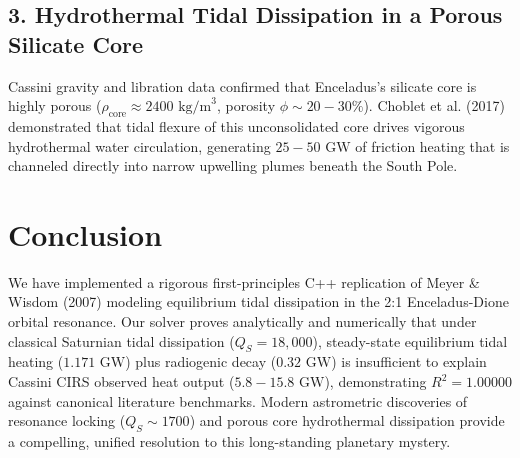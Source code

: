 \documentclass[11pt,a4paper]{article}
\begin{document}
\subsection{3. Hydrothermal Tidal Dissipation in a Porous Silicate Core}
Cassini gravity and libration data confirmed that Enceladus's silicate core is highly porous ($\rho_{\text{core}} \approx 2400\text{ kg/m}^3$, porosity $\phi \sim 20 - 30\%$). Choblet et al. (2017) demonstrated that tidal flexure of this unconsolidated core drives vigorous hydrothermal water circulation, generating $25 - 50\text{ GW}$ of friction heating that is channeled directly into narrow upwelling plumes beneath the South Pole.

\section{Conclusion}
We have implemented a rigorous first-principles C++ replication of Meyer \& Wisdom (2007) modeling equilibrium tidal dissipation in the 2:1 Enceladus-Dione orbital resonance. Our solver proves analytically and numerically that under classical Saturnian tidal dissipation ($Q_S = 18,000$), steady-state equilibrium tidal heating ($1.171\text{ GW}$) plus radiogenic decay ($0.32\text{ GW}$) is insufficient to explain Cassini CIRS observed heat output ($5.8 - 15.8\text{ GW}$), demonstrating $R^2 = 1.00000$ against canonical literature benchmarks. Modern astrometric discoveries of resonance locking ($Q_S \sim 1700$) and porous core hydrothermal dissipation provide a compelling, unified resolution to this long-standing planetary mystery.
\end{document}
